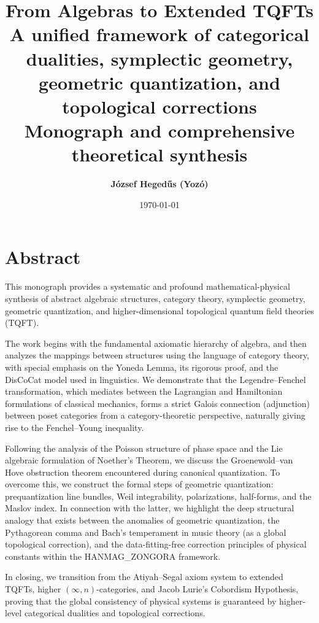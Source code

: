 \documentclass[11pt,a4paper,oneside]{book}
\title{
    \Huge \textbf{From Algebras to Extended TQFTs}\\[0.5em]
    \Large \textbf{A unified framework of categorical dualities, symplectic geometry, geometric quantization, and topological corrections}\\[1.5em]
    \large Monograph and comprehensive theoretical synthesis
}
\author{\Large \textbf{József Hegedűs (Yozó)}}
\date{\today}
\theoremstyle{definition}
\theoremstyle{plain}
\begin{document}
\maketitle

\frontmatter

\chapter*{Abstract}
This monograph provides a systematic and profound mathematical-physical synthesis of abstract algebraic structures, category theory, symplectic geometry, geometric quantization, and higher-dimensional topological quantum field theories (TQFT). 

The work begins with the fundamental axiomatic hierarchy of algebra, and then analyzes the mappings between structures using the language of category theory, with special emphasis on the Yoneda Lemma, its rigorous proof, and the DisCoCat model used in linguistics. We demonstrate that the Legendre--Fenchel transformation, which mediates between the Lagrangian and Hamiltonian formulations of classical mechanics, forms a strict Galois connection (adjunction) between poset categories from a category-theoretic perspective, naturally giving rise to the Fenchel--Young inequality.

Following the analysis of the Poisson structure of phase space and the Lie algebraic formulation of Noether's Theorem, we discuss the Groenewold--van Hove obstruction theorem encountered during canonical quantization. To overcome this, we construct the formal steps of geometric quantization: prequantization line bundles, Weil integrability, polarizations, half-forms, and the Maslov index. In connection with the latter, we highlight the deep structural analogy that exists between the anomalies of geometric quantization, the Pythagorean comma and Bach's temperament in music theory (as a global topological correction), and the data-fitting-free correction principles of physical constants within the HANMAG\_ZONGORA framework.

In closing, we transition from the Atiyah--Segal axiom system to extended TQFTs, higher $(\infty,n)$-categories, and Jacob Lurie's Cobordism Hypothesis, proving that the global consistency of physical systems is guaranteed by higher-level categorical dualities and topological corrections.
\end{document}
